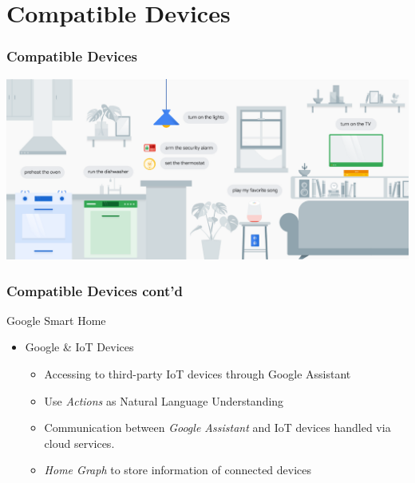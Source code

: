 \documentclass{beamer}
\begin{document}

\section{Compatible Devices}

\begin{frame}
\frametitle{Compatible Devices}
\begin{center}
\includegraphics[scale=0.30]{pictures/smart_home.png} 
\end{center}
\end{frame}

\begin{frame}
\frametitle{Compatible Devices cont'd}
\begin{block}{Google Smart Home}
\begin{itemize}
\item Google \& IoT Devices
\begin{itemize}
\item Accessing to third-party IoT devices through Google Assistant
\item Use \textit{Actions} as Natural Language Understanding
\item Communication between \textit{Google Assistant} and IoT devices handled via cloud services.
\item \textit{Home Graph} to store information of connected devices
\end{itemize}
\end{itemize}
\end{block}
\end{frame}
\end{document}

